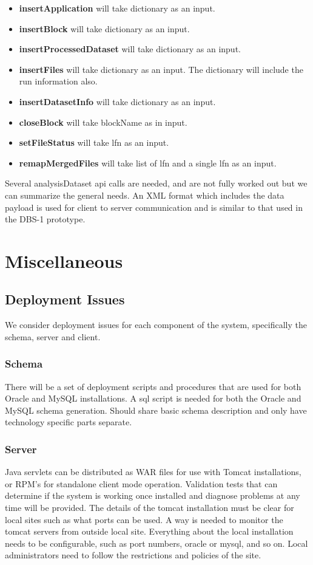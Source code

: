 \documentclass{cmspaper}
\begin{document}
\begin{itemize}
   \item {\bf insertApplication} will take dictionary as an input.
   \item {\bf insertBlock} will take dictionary as an input.
   \item {\bf insertProcessedDataset} will take dictionary as an input.
   \item {\bf insertFiles} will take dictionary as an input. The dictionary will include the run information also.
   \item {\bf insertDatasetInfo} will take dictionary as an input.
   \item {\bf closeBlock} will take blockName as in input.
   \item {\bf setFileStatus} will take lfn as an input.
   \item {\bf remapMergedFiles} will take list of lfn and a single lfn as an input.
\end{itemize}

Several analysisDataset api calls are needed, and are not fully worked out but we can summarize the general needs. An XML format which includes the data payload is used for client to server communication and is similar to that used in the DBS-1 prototype.



\section{Miscellaneous}
\subsection{Deployment Issues}
We consider deployment issues for each component of the system, specifically the schema, server and client. 
\subsubsection{Schema}
There will be a set of deployment scripts and procedures that are used for both Oracle and MySQL installations. A sql script is needed for both the Oracle and MySQL schema generation. Should share basic schema description and only have technology specific parts separate.
   
\subsubsection{Server}
  Java servlets can be distributed as WAR files for use with Tomcat installations,  or  RPM's for standalone client mode operation. Validation tests that can determine if the system is working once installed and diagnose problems at any time will be provided. The details of the tomcat installation must be clear for local sites such as what ports can be used. A way is needed to monitor the tomcat servers from outside local site. Everything about the local installation needs to be configurable, such as port numbers, oracle or mysql, and so on. Local administrators need to follow the restrictions and policies of the site.
\end{document}
